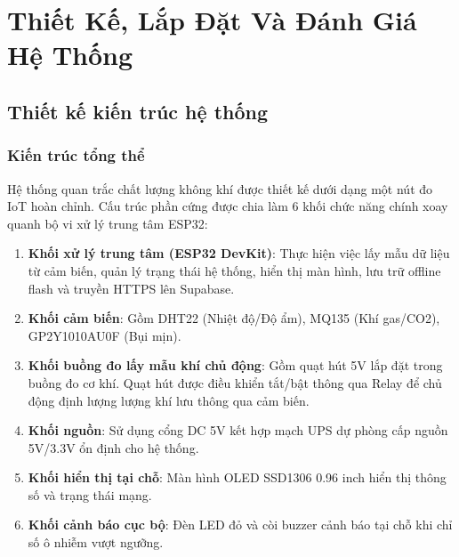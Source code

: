 \chapter{Thiết Kế, Lắp Đặt Và Đánh Giá Hệ Thống}

\section{Thiết kế kiến trúc hệ thống}
\subsection{Kiến trúc tổng thể}
Hệ thống quan trắc chất lượng không khí được thiết kế dưới dạng một nút đo IoT hoàn chỉnh. Cấu trúc phần cứng được chia làm 6 khối chức năng chính xoay quanh bộ vi xử lý trung tâm ESP32:
\begin{enumerate}
    \item \textbf{Khối xử lý trung tâm (ESP32 DevKit)}: Thực hiện việc lấy mẫu dữ liệu từ cảm biến, quản lý trạng thái hệ thống, hiển thị màn hình, lưu trữ offline flash và truyền HTTPS lên Supabase.
    \item \textbf{Khối cảm biến}: Gồm DHT22 (Nhiệt độ/Độ ẩm), MQ135 (Khí gas/CO2), GP2Y1010AU0F (Bụi mịn).
    \item \textbf{Khối buồng đo lấy mẫu khí chủ động}: Gồm quạt hút 5V lắp đặt trong buồng đo cơ khí. Quạt hút được điều khiển tắt/bật thông qua Relay để chủ động định lượng lượng khí lưu thông qua cảm biến.
    \item \textbf{Khối nguồn}: Sử dụng cổng DC 5V kết hợp mạch UPS dự phòng cấp nguồn 5V/3.3V ổn định cho hệ thống.
    \item \textbf{Khối hiển thị tại chỗ}: Màn hình OLED SSD1306 0.96 inch hiển thị thông số và trạng thái mạng.
    \item \textbf{Khối cảnh báo cục bộ}: Đèn LED đỏ và còi buzzer cảnh báo tại chỗ khi chỉ số ô nhiễm vượt ngưỡng.
\end{enumerate}

